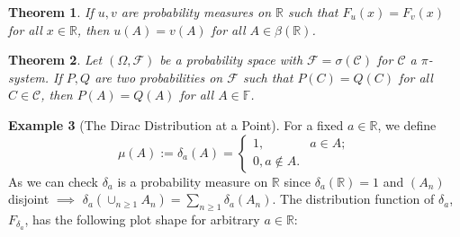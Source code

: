 \documentclass[12pt,reqno]{article}
\theoremstyle{plain}
\newtheorem{theorem}{Theorem}[section]
\theoremstyle{definition}
\newtheorem{example}[theorem]{Example}
\begin{document}
\begin{theorem}
If $u,v$ are probability measures on $\mathbb{R}$ such that 
$F_u(x) = F_v(x)$ for all $x \in \mathbb{R}$, then 
$u(A) = v(A)$ for all $A \in \beta(\mathbb{R})$. 
\end{theorem} 

\begin{theorem} 
Let $(\Omega, \mathcal{F})$ be a probability space with 
$\mathcal{F} = \sigma(\mathcal{C})$ for $\mathcal{C}$ a $\pi$-system. 
If $P,Q$ are two probabilities on $\mathcal{F}$ such that 
$P(C) = Q(C)$ for all $C \in \mathcal{C}$, then 
$P(A) = Q(A)$ for all $A \in \mathbb{F}$. 
\end{theorem} 

\begin{example}[The Dirac Distribution at a Point]
For a fixed $a \in \mathbb{R}$, we define 
\[
\mu(A) := \delta_a(A) = \begin{cases} 
     1, & a \in A; \\ 0, a \notin A.
     \end{cases}
\]
As we can check $\delta_a$ is a probability measure on $\mathbb{R}$ since 
$\delta_a(\mathbb{R}) = 1$ and $(A_n)$ disjoint $\implies$ 
$\delta_a\left(\cup_{n \geq 1} A_n\right) = \sum_{n \geq 1} \delta_a(A_n)$. 
The distribution function of $\delta_a$, $F_{\delta_a}$, has the following 
plot shape for arbitrary $a \in \mathbb{R}$: 
\begin{center}
\end{center} 
\end{example} 
\end{document}
